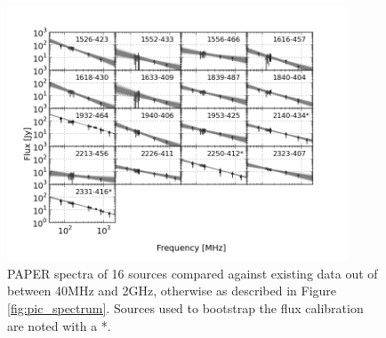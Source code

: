 \documentclass[preprint]{aastex}
\begin{document}
\begin{figure}[htbp]
\begin{center}
\includegraphics[width=0.9\textwidth]{plots/srcfig_3.png}
\caption{
PAPER spectra of 16 sources compared against existing data out of
\cite{Vollmer:2010p6422} between 40MHz and 2GHz, otherwise as described in
Figure \ref{fig:pic_spectrum}.\label{fig:srcs3} Sources used to bootstrap the
flux calibration are noted with a *.
}
\end{center}
\end{figure}
\end{document}
